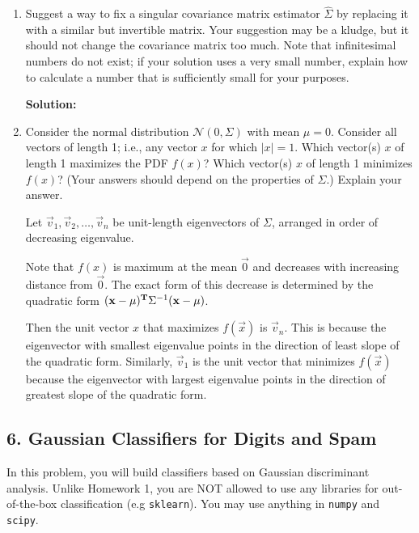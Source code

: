 \documentclass{article}
\newcommand{\solution}{\textbf{Solution: }}
\renewcommand{\N}{\mathcal{N}}
\renewcommand{\hat}{\widehat}
\begin{document}
\begin{enumerate}[label=(\alph*)]
\begin{mdframed}
    \end{mdframed}

    \item Suggest a way to fix a singular covariance matrix estimator $\hat{\Sigma}$ by replacing it with a similar but invertible matrix. Your suggestion may be a kludge, but it should not change the covariance matrix too much. Note that infinitesimal numbers do not exist; if your solution uses a very small number, explain how to calculate a number that is sufficiently small for your purposes.
    \begin{mdframed} \solution
    \end{mdframed}

  \item Consider the normal distribution $\N(0, \Sigma)$ with mean $\mu =
    0$. Consider all vectors of length 1; i.e., any vector $x$ for which
    $|x| =1$. Which vector(s) $x$ of length 1 maximizes the PDF $f(x)$? Which
    vector(s) $x$ of length 1 minimizes $f(x)$? (Your answers should depend on
    the properties of $\Sigma$.) Explain your answer.
    \begin{mdframed}
      Let $\vec v_1, \vec v_2, \ldots, \vec v_n$ be unit-length eigenvectors of
      $\Sigma$, arranged in order of decreasing eigenvalue.

      Note that $f(x)$ is maximum at the mean $\vec 0$ and decreases with
      increasing distance from $\vec 0$. The exact form of this decrease is
      determined by the quadratic form
      $(\mathbf x - \mu)^{\mathbf{T}}\Sigma^{-1} (\mathbf x - \mu)$.

      Then the unit vector $x$ that maximizes $f(\vec x)$ is $\vec v_n$. This
      is because the eigenvector with smallest eigenvalue points in the
      direction of least slope of the quadratic form. Similarly, $\vec v_1$ is
      the unit vector that minimizes $f(\vec x)$ because the eigenvector with
      largest eigenvalue points in the direction of greatest slope of the
      quadratic form.
    \end{mdframed}
\end{enumerate}

\newpage
\subsection*{6. Gaussian Classifiers for Digits and Spam}
In this problem, you will build classifiers based on Gaussian discriminant analysis. Unlike Homework 1, you are NOT allowed to use any libraries for out-of-the-box classification (e.g \texttt{sklearn}). You may use anything in \texttt{numpy} and \texttt{scipy}. \\
\end{document}
